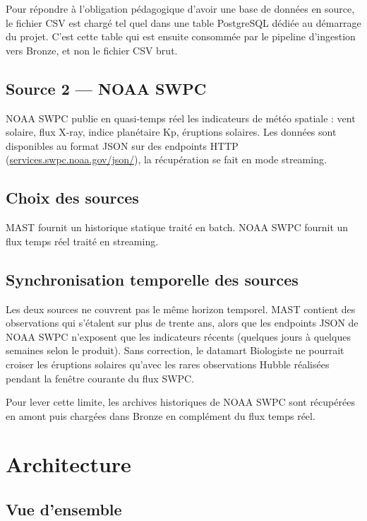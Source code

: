 \documentclass[11pt,a4paper]{article}
\begin{document}
Pour répondre à l'obligation pédagogique d'avoir une base de données en source, le fichier CSV est chargé tel quel dans une table PostgreSQL dédiée au démarrage du projet. C'est cette table qui est ensuite consommée par le pipeline d'ingestion vers Bronze, et non le fichier CSV brut.

\subsection{Source 2 --- NOAA SWPC}

NOAA SWPC publie en quasi-temps réel les indicateurs de météo spatiale : vent solaire, flux X-ray, indice planétaire Kp, éruptions solaires. Les données sont disponibles au format JSON sur des endpoints HTTP (\href{https://services.swpc.noaa.gov/json/}{services.swpc.noaa.gov/json/}), la récupération se fait en mode streaming.

\subsection{Choix des sources}

MAST fournit un historique statique traité en batch. NOAA SWPC fournit un flux temps réel traité en streaming.

\subsection{Synchronisation temporelle des sources}

Les deux sources ne couvrent pas le même horizon temporel. MAST contient des observations qui s'étalent sur plus de trente ans, alors que les endpoints JSON de NOAA SWPC n'exposent que les indicateurs récents (quelques jours à quelques semaines selon le produit). Sans correction, le datamart Biologiste ne pourrait croiser les éruptions solaires qu'avec les rares observations Hubble réalisées pendant la fenêtre courante du flux SWPC.

Pour lever cette limite, les archives historiques de NOAA SWPC sont récupérées en amont puis chargées dans Bronze en complément du flux temps réel. 
\newpage
\section{Architecture}

\subsection{Vue d'ensemble}
\end{document}
